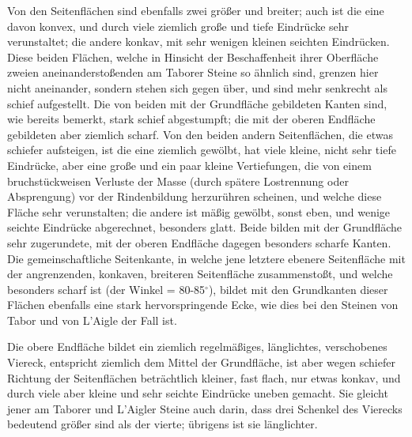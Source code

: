 \documentclass[a4paper, 11pt, oneside, german]{article}
\begin{document}
Von den Seitenflächen sind ebenfalls zwei größer und breiter; auch ist die eine davon konvex, und durch viele ziemlich große und tiefe Eindrücke sehr verunstaltet; die andere konkav, mit sehr wenigen kleinen seichten Eindrücken. Diese beiden Flächen, welche in Hinsicht der Beschaffenheit ihrer Oberfläche zweien aneinanderstoßenden am Taborer Steine so ähnlich sind, grenzen hier nicht aneinander, sondern stehen sich gegen über, und sind mehr senkrecht als schief aufgestellt. Die von beiden mit der Grundfläche gebildeten Kanten sind, wie bereits bemerkt, stark schief abgestumpft; die mit der oberen Endfläche gebildeten aber ziemlich scharf. Von den beiden andern Seitenflächen, die etwas schiefer aufsteigen, ist die eine ziemlich gewölbt, hat viele kleine, nicht sehr tiefe Eindrücke, aber eine große und ein paar kleine Vertiefungen, die von einem bruchstückweisen Verluste der Masse (durch spätere Lostrennung oder Absprengung) vor der Rindenbildung herzurühren scheinen, und welche diese Fläche sehr verunstalten; die andere ist mäßig gewölbt, sonst eben, und wenige seichte Eindrücke abgerechnet, besonders glatt. Beide bilden mit der Grundfläche sehr zugerundete, mit der oberen Endfläche dagegen besonders scharfe Kanten. Die gemeinschaftliche Seitenkante, in welche jene letztere ebenere Seitenfläche mit der angrenzenden, konkaven, breiteren Seitenfläche zusammenstoßt, und welche besonders scharf ist (der Winkel = 80-85$^{\circ}$), bildet mit den Grundkanten dieser Flächen ebenfalls eine stark hervorspringende Ecke, wie dies bei den Steinen von Tabor und von L'Aigle der Fall ist.

Die obere Endfläche bildet ein ziemlich regelmäßiges, länglichtes, verschobenes Viereck, entspricht ziemlich dem Mittel der Grundfläche, ist aber wegen schiefer Richtung der Seitenflächen beträchtlich kleiner, fast flach, nur etwas konkav, und durch viele aber kleine und sehr seichte Eindrücke uneben gemacht. Sie gleicht jener am Taborer und L'Aigler Steine auch darin, dass drei Schenkel des Vierecks bedeutend größer sind als der vierte; übrigens ist sie länglichter.
\end{document}
